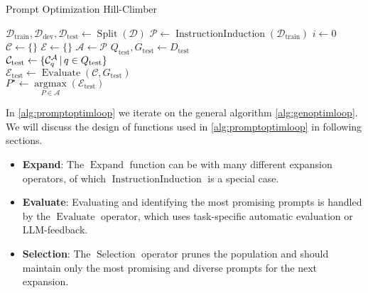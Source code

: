\begin{algorithm}
    \caption{Prompt Optimization Hill-Climber}
    \label{alg:promptoptimloop}
    $\mathcal{D}_{\text{train}}, \mathcal{D}_{\text{dev}}, \mathcal{D}_{\text{test}} \gets \operatorname{Split}(\mathcal{D})$ 
    $\mathcal{P} \gets \operatorname{InstructionInduction}(\mathcal{D}_{\text{train}})$ 
    $i \gets 0$ 
    $\mathcal{C} \gets \{\}$  
    $\mathcal{E} \gets \{\}$ 
    $\mathcal{A} \gets \mathcal{P}$ 
    $Q_{\text{test}}, G_{\text{test}} \gets D_{\text{test}}$\\
    $\mathcal{C}_{\text{test}} \gets \{\mathcal{C}_{q}^{\mathcal{A}}\, \vert \, q \in Q_{\text{test}}\}$\\
    $\mathcal{E}_{\text{test}} \gets \operatorname{Evaluate}(\mathcal{C}, G_{\text{test}})$\\
    $P^{\star} \gets \underset{P\in\mathcal{A}}{\operatorname{argmax}}(\mathcal{E}_{\text{test}})$\\
\end{algorithm}
In \ref{alg:promptoptimloop} we iterate on the general algorithm \ref{alg:genoptimloop}. 
We will discuss the design of functions used in \ref{alg:promptoptimloop} in following sections.
\begin{itemize}
    \item \textbf{Expand}: The $\operatorname{Expand}$ function can be with many different expansion operators, of which $\operatorname{InstructionInduction}$
    is a special case. 
    \item \textbf{Evaluate}: Evaluating and identifying the most promising prompts is handled by the $\operatorname{Evaluate}$ operator, which uses task-specific automatic evaluation or LLM-feedback.
    \item \textbf{Selection}: The $\operatorname{Selection}$ operator prunes the population and should maintain only the most promising and diverse prompts for the next expansion.
\end{itemize}

